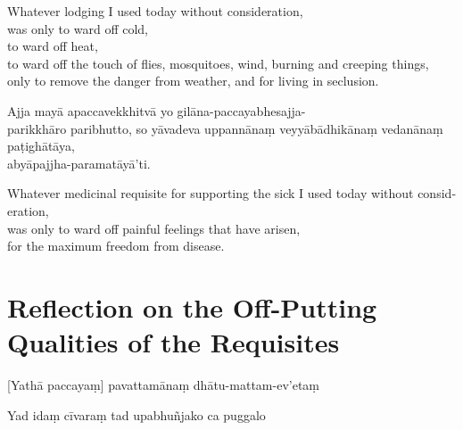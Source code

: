 \begin{english}
  Whatever lodging I used today without consideration,\\
  was only to ward off cold,\\
  to ward off heat,\\
  to ward off the touch of flies, mosquitoes, wind, burning and creeping things,\\
  only to remove the danger from weather, and for living in seclusion.
\end{english}

Ajja mayā apaccavekkhitvā yo gilāna-paccayabhesajja-\\ parikkhāro paribhutto, so
yāvadeva uppannānaṃ veyyābādhikānaṃ vedanānaṃ paṭighātāya,\\
abyāpajjha-paramatāyā'ti.

\begin{english}
  Whatever medicinal requisite for supporting the sick I used today without consideration,\\
  was only to ward off painful feelings that have arisen,\\
  for the maximum freedom from disease.
\end{english}


\section[Reflection on the Off-Putting Qualities]{Reflection on the Off-Putting Qualities of the Requisites}



\begin{leader}
\end{leader}


[Yathā paccayaṃ] pavattamānaṃ dhātu-mattam-ev'etaṃ


Yad idaṃ cīvaraṃ tad upabhuñjako ca puggalo


